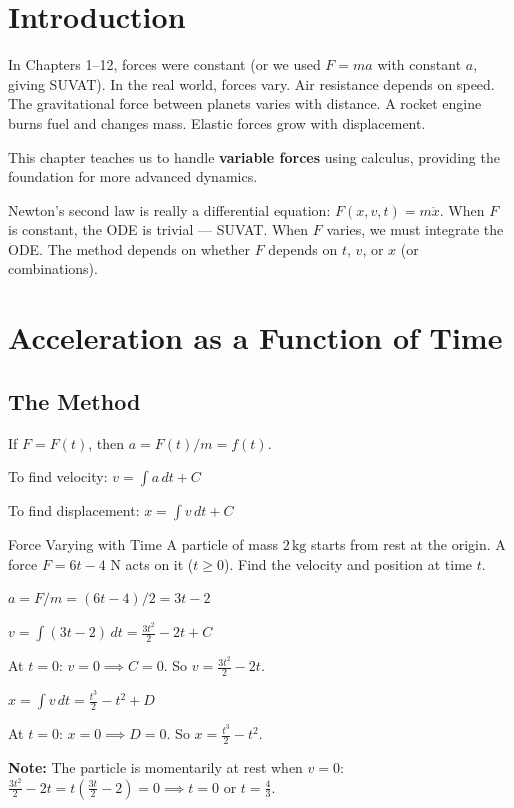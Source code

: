 \documentclass[12pt, a4paper]{book}
\newcommand{\kg}{\,\mathrm{kg}}
\newcommand{\N}{\,\mathrm{N}}
\begin{document}
\section{Introduction}

In Chapters 1--12, forces were constant (or we used $F = ma$ with constant $a$, giving SUVAT). In the real world, forces vary. Air resistance depends on speed. The gravitational force between planets varies with distance. A rocket engine burns fuel and changes mass. Elastic forces grow with displacement.

This chapter teaches us to handle \textbf{variable forces} using calculus, providing the foundation for more advanced dynamics.

\begin{intuitionbox}
Newton's second law is really a differential equation: $F(x, v, t) = m\ddot{x}$. When $F$ is constant, the ODE is trivial --- SUVAT. When $F$ varies, we must integrate the ODE. The method depends on whether $F$ depends on $t$, $v$, or $x$ (or combinations).
\end{intuitionbox}

\section{Acceleration as a Function of Time}

\subsection{The Method}

If $F = F(t)$, then $a = F(t)/m = f(t)$.

To find velocity: $v = \int a\,dt + C$

To find displacement: $x = \int v\,dt + C$

\begin{exmp}{Force Varying with Time}{}
A particle of mass $2\kg$ starts from rest at the origin. A force $F = 6t - 4\,\N$ acts on it ($t \geq 0$). Find the velocity and position at time $t$.

\medskip
$a = F/m = (6t-4)/2 = 3t - 2$

$v = \int (3t-2)\,dt = \frac{3t^2}{2} - 2t + C$

At $t = 0$: $v = 0 \implies C = 0$. So $v = \frac{3t^2}{2} - 2t$.

$x = \int v\,dt = \frac{t^3}{2} - t^2 + D$

At $t = 0$: $x = 0 \implies D = 0$. So $x = \frac{t^3}{2} - t^2$.

\textbf{Note:} The particle is momentarily at rest when $v = 0$: $\frac{3t^2}{2} - 2t = t(\frac{3t}{2}-2) = 0 \implies t = 0$ or $t = \frac{4}{3}$.
\end{exmp}
\end{document}
